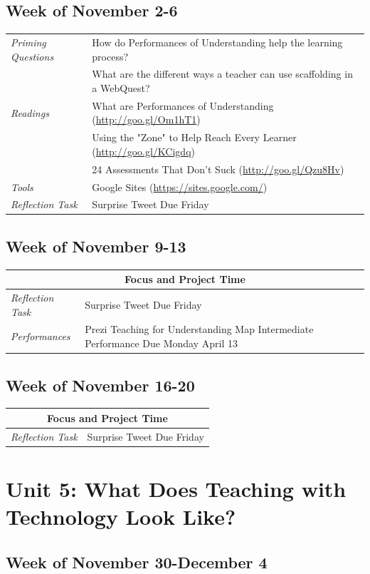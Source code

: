 \documentclass{tufte-handout}
\newcommand{\tabpq}{\faQuestionSign\medspace\textit{Priming Questions}}
\newcommand{\tabread}{\faBook\medspace\textit{Readings}}
\newcommand{\tabtools}{\faWrench\medspace\textit{Tools}}
\newcommand{\tabtweet}{\faLightbulb\medspace\textit{Reflection Task} & Surprise Tweet Due Friday \\}
\newcommand{\tabperformance}{\faTasks\medspace\textit{Performances}}
\newenvironment{tabsched}
	{\small
	\begin{tabular}{p{1.5in}p{5in}}
	\toprule}
	{\bottomrule
	\end{tabular}
	\normalsize}
\newcommand{\weektwelve}{November 2-6}
\newcommand{\weekthirteen}{November 9-13}
\newcommand{\weekfourteen}{November 16-20}
\newcommand{\weekfifteen}{November 30-December 4}
\begin{document}
\begin{fullwidth}
\subsection{Week of \weektwelve}

\begin{tabsched}
	\tabpq & How do Performances of Understanding help the learning process? \\
	& What are the different ways a teacher can use scaffolding in a WebQuest? \\
	\midrule
	\tabread & What are Performances of Understanding (\url{http://goo.gl/Om1hT1}) \\
	& Using the "Zone" to Help Reach Every Learner (\url{http://goo.gl/KCigdq}) \\
	& 24 Assessments That Don't Suck (\url{http://goo.gl/Qzu8Hv}) \\
	\midrule
	\tabtools & Google Sites (\url{https://sites.google.com/}) \\
	\midrule
	\tabtweet
\end{tabsched}

\subsection{Week of \weekthirteen}

\begin{tabsched}
	\multicolumn{2}{c}{\textbf{Focus and Project Time}} \\
	\midrule
	\tabtweet
	\midrule
	\tabperformance & Prezi Teaching for Understanding Map Intermediate Performance Due Monday April 13 \\
\end{tabsched}

\subsection{Week of \weekfourteen}

\begin{tabsched}
	\multicolumn{2}{c}{\textbf{Focus and Project Time}} \\
	\midrule
	\tabtweet
\end{tabsched}

\section{Unit 5: What Does Teaching with Technology Look Like?}

\subsection{Week of \weekfifteen}


\end{fullwidth}
\end{document}
